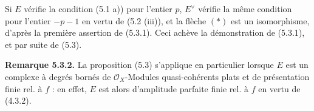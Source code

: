 Si \(E\)
vérifie la condition (5.1 a)) pour l'entier \(p\), \(E^{\vee}\) vérifie la même condition pour l'entier \(-p-1\) en vertu de (5.2 (iii)), et la flèche \((*)\) est un isomorphisme, d'après la première assertion de (5.3.1). Ceci achève la démonstration de (5.3.1), et par suite de (5.3).

\textbf{Remarque 5.3.2.} La proposition (5.3) s'applique en particulier lorsque \(E\) est un complexe à degrés bornés de \(\mathcal O_X\)-Modules quasi-cohérents plats et de présentation finie rel. à \(f\) : en effet, \(E\) est alors d'amplitude parfaite finie rel. à \(f\) en vertu de (4.3.2).

